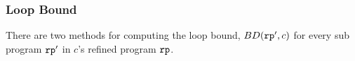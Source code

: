 
\subsubsection{Loop Bound}
There are two methods for computing the loop bound, $BD(\mathtt{rp}', c)$ for every sub program $\mathtt{rp}'$ in $c$'s refined program $\mathtt{rp}$.
%

